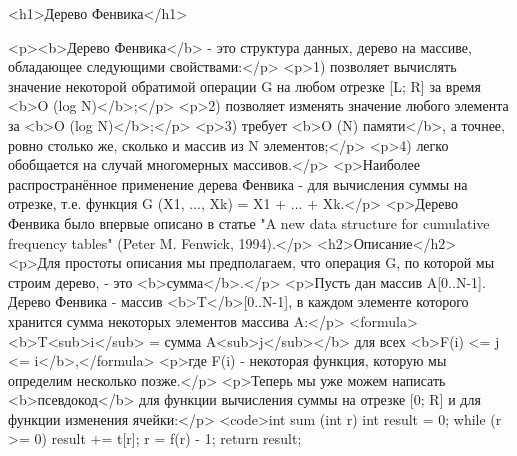 <h1>Дерево Фенвика</h1>

<p><b>Дерево Фенвика</b> - это структура данных, дерево на массиве, обладающее следующими свойствами:</p>
<p>1) позволяет вычислять значение некоторой обратимой операции G на любом отрезке [L; R] за время <b>O (log N)</b>;</p>
<p>2) позволяет изменять значение любого элемента за <b>O (log N)</b>;</p>
<p>3) требует <b>O (N) памяти</b>, а точнее, ровно столько же, сколько и массив из N элементов;</p>
<p>4) легко обобщается на случай многомерных массивов.</p>
<p>Наиболее распространённое применение дерева Фенвика - для вычисления суммы на отрезке, т.е. функция G (X1, ..., Xk) = X1 + ... + Xk.</p>
<p>Дерево Фенвика было впервые описано в статье "A new data structure for cumulative frequency tables" (Peter M. Fenwick, 1994).</p>
<h2>Описание</h2>
<p>Для простоты описания мы предполагаем, что операция G, по которой мы строим дерево, - это <b>сумма</b>.</p>
<p>Пусть дан массив A[0..N-1]. Дерево Фенвика - массив <b>T</b>[0..N-1], в каждом элементе которого хранится сумма некоторых элементов массива A:</p>
<formula><b>T<sub>i</sub> = сумма A<sub>j</sub></b> для всех <b>F(i) <= j <= i</b>,</formula>
<p>где F(i) - некоторая функция, которую мы определим несколько позже.</p>
<p>Теперь мы уже можем написать <b>псевдокод</b> для функции вычисления суммы на отрезке [0; R] и для функции изменения ячейки:</p>
<code>int sum (int r)
{
	int result = 0;
	while (r >= 0) {
		result += t[r];
		r = f(r) - 1;
	}
	return result;
}

